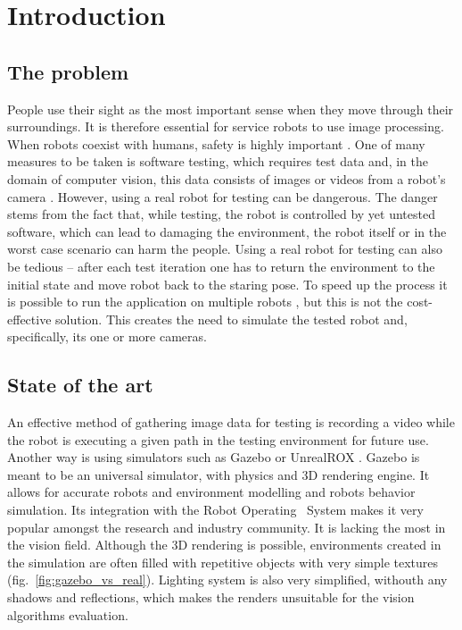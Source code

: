 \documentclass{svproc}
\begin{document}
\section{Introduction}

\subsection{The problem}

People use their sight as the most important sense when they move through their surroundings.
It is therefore essential for service robots to use image processing.
When robots coexist with humans, safety is highly important \cite{haddadin2007safety}.
One of many measures to be taken is software testing,
which requires test data and, in the domain of computer vision, this data consists of images or videos from a robot's camera \cite{7759425}.
However, using a real robot for testing can be dangerous.
The danger stems from the fact that, while testing, the robot is controlled by yet untested software, which can lead to damaging the environment, the robot itself or in the worst case scenario can harm the people.
Using a real robot for testing can also be tedious -- after each test iteration one has to return the environment to the initial state and move robot back to the staring pose.
To speed up the process it is possible to run the application on multiple robots \cite{levine2018learning}, but this is not the cost-effective solution.
This creates the need to simulate the tested robot and, specifically, its one or more cameras.

\subsection{State of the art}
An effective method of gathering image data for testing is recording a video while the robot is executing a given path in the testing environment for future use.
Another way is using simulators such as Gazebo \cite{koenig2004design} or UnrealROX \cite{martinez2019unrealrox}.
Gazebo is meant to be an universal simulator, with physics and 3D rendering engine. It allows for accurate 
robots and environment modelling and robots behavior simulation. Its integration with the Robot Operating \
System makes it very popular amongst the research and industry community. It is lacking the most in the vision 
field. Although the 3D rendering is possible, environments created in the simulation are often filled
with repetitive objects with very simple textures (fig.~\ref{fig:gazebo_vs_real}).
 Lighting system is also very simplified, withouth any 
shadows and reflections, which makes the renders unsuitable for the vision algorithms evaluation. 
\end{document}
